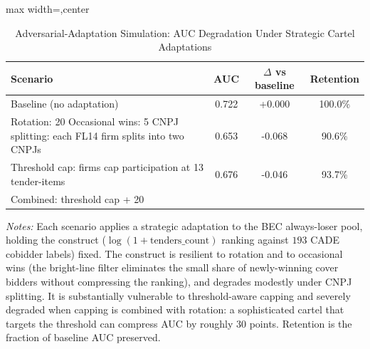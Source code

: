 \begin{table}[htbp]
\centering
\caption{Adversarial-Adaptation Simulation: AUC Degradation Under Strategic Cartel Adaptations}
\label{tab:adversarial_adaptation}
\footnotesize
\begin{adjustbox}{max width=\textwidth,center}
\begin{tabular}{p{8cm}ccc}
\toprule
Scenario & AUC & $\Delta$ vs baseline & Retention \\
\midrule
Baseline (no adaptation) & 0.722 & +0.000 & 100.0\% \\
Rotation: 20%
Occasional wins: 5%
CNPJ splitting: each FL14 firm splits into two CNPJs & 0.653 & -0.068 & 90.6\% \\
Threshold cap: firms cap participation at 13 tender-items & 0.676 & -0.046 & 93.7\% \\
Combined: threshold cap + 20%
\bottomrule
\end{tabular}
\end{adjustbox}

\smallskip
{\footnotesize\textit{Notes:} Each scenario applies a strategic
adaptation to the BEC always-loser pool, holding the construct
($\log(1{+}\text{tenders\_count})$ ranking against $193$ CADE
cobidder labels) fixed. The construct is resilient to rotation
and to occasional wins (the bright-line filter eliminates the
small share of newly-winning cover bidders without compressing
the ranking), and degrades modestly under CNPJ splitting. It is
substantially vulnerable to threshold-aware capping and severely
degraded when capping is combined with rotation: a sophisticated
cartel that targets the threshold can compress AUC by roughly
$30$ points. Retention is the fraction of baseline AUC preserved.\par}
\end{table}
